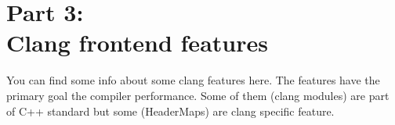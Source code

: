 \pagestyle{empty}
\pagecolor{Gray}
\color{black}

\chapter*{\textbf{Part 3:\\
    Clang frontend features}}

\begin{flushleft}

You can find some info about some clang features here. The features have the
primary goal the compiler performance. Some of them (clang modules) are part of
C++ standard but some (HeaderMaps) are clang specific feature. 
  
\end{flushleft}

\clearpage

\nopagecolor


\clearpage
